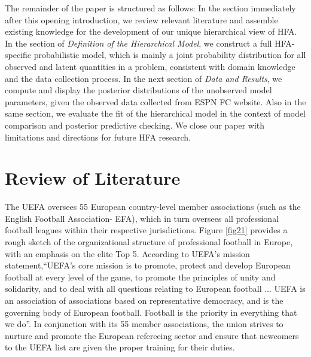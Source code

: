 \documentclass[USenglish]{article}
\begin{document}
The remainder of the paper is structured as follows: In the section immediately after this opening introduction, we review relevant literature and assemble existing knowledge for the development of our unique hierarchical view of HFA. 
In the section of \textit{Definition of the Hierarchical Model}, we construct a full HFA-specific probabilistic model, which is mainly a joint probability distribution for all observed and latent quantities in a problem, consistent with domain knowledge and the data collection process.
In the next section of \textit{Data and Results}, we compute and display the posterior distributions of the unobserved model parameters, given the observed data collected from ESPN FC website. Also in the same section, we evaluate the fit of the hierarchical model in the context of model comparison and posterior predictive checking. We close our paper with limitations and directions for future HFA research.
 
\section{Review of Literature} 

The UEFA oversees 55 European country-level member associations (such as the English Football Association- EFA), which in turn oversees all professional football leagues within their respective jurisdictions. Figure \ref{fig21} provides a rough sketch of the organizational structure of professional football in Europe, with an emphasis on the elite Top 5. According to UEFA's mission statement,``UEFA's core mission is to promote, protect and develop European football at every level of the game, to promote the principles of unity and solidarity, and to deal with all questions relating to European football ... UEFA is an association of associations based on representative democracy, and is the governing body of European football. Football is the priority in everything that we do''.
In conjunction with its 55 member associations, the union strives to nurture and promote the European refereeing sector  and ensure that newcomers to the UEFA list are given the proper training for their duties.
\end{document}
